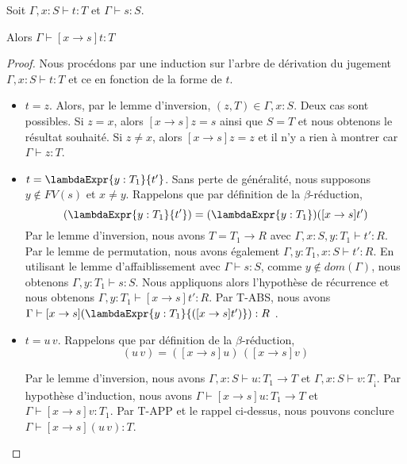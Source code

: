 \begin{lemma} 
  \label{thm:simply-typed-lambda-calculus-preservation-substitution}
  Soit $\Gamma, x : S \vdash t : T$ et $\Gamma \vdash s : S$.

  Alors $\Gamma \vdash [x \rightarrow s] t : T$
\end{lemma}

\begin{proof}
  \label{proof:simply-typed-lambda-calculus-preservation-substitution}
  Nous procédons par une induction sur l'arbre de dérivation du jugement $\Gamma, x : S
  \vdash t : T$ et ce en fonction de la forme de $t$.

  \begin{itemize}
  \item $t = z$. Alors, par le lemme d'inversion, $(z, T) \in \Gamma, x : S$.
    Deux cas sont possibles. Si $z = x$, alors $[x \rightarrow s] z = s$ ainsi que
    $S = T$ et nous obtenons le résultat souhaité. Si $z \neq x$,
    alors $[x \rightarrow s] z = z$ et il n'y a rien à montrer car $\Gamma
    \vdash z : T$.
  \item $t = \lambdaExpr{y : T_{1}}{t'}$.
    Sans perte de généralité, nous supposons
      $y \notin FV(s)$ et $x \neq y$. 
    Rappelons que par définition de la $\beta$-réduction,
    \begin{equation*}
      [x \rightarrow s](\lambdaExpr{y : T_{1}}{t'}) = (\lambdaExpr{y : T_{1}})([x \rightarrow s] t')
    \end{equation*}
    Par le lemme d'inversion, nous avons $T = T_{1} \rightarrow R$ avec
      $\Gamma, x : S, y : T_{1} \vdash t' : R$. Par le lemme de permutation,
      nous avons également $\Gamma, y : T_{1}, x : S \vdash t' : R$. En utilisant le lemme
      d'affaiblissement avec $\Gamma \vdash s : S$, comme $y \notin dom(\Gamma)$,
      nous obtenons $\Gamma, y : T_{1} \vdash s : S$.
      Nous appliquons alors l'hypothèse de récurrence et nous obtenons
      $\Gamma, y : T_{1} \vdash [x \rightarrow s] t' : R$. Par T-ABS, nous avons
      $\Gamma \vdash [x \rightarrow s] (\lambdaExpr{y : T_{1}}{([x \rightarrow s]t')}) : R$ .

    \item $t = u \, v$.
      Rappelons que par définition de la $\beta$-réduction,
      \begin{equation*}
        [x \rightarrow s](u \, v) = ([x \rightarrow s] u) \, ([x \rightarrow s] v)
      \end{equation*}

      Par le lemme d'inversion, nous avons $\Gamma, x : S
      \vdash u : T_{1} \rightarrow T$ et $\Gamma, x : S \vdash v : T_{¡}$. Par
      hypothèse d'induction, nous avons $\Gamma \vdash [x \rightarrow s]u :
      T_{1} \rightarrow T$ et
      $\Gamma \vdash [x \rightarrow s]v : T_{1}$. Par T-APP et le rappel
      ci-dessus, nous pouvons conclure $\Gamma \vdash [x \rightarrow s](u \, v)
      : T$.
  \end{itemize}
  
\end{proof}

